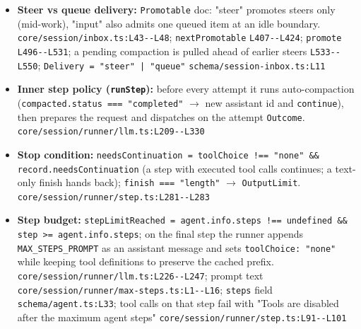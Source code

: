 \begin{itemize}
\item \textbf{Steer vs queue delivery:} \texttt{Promotable} doc: "steer" promotes steers only (mid-work), "input" also admits one queued item at an idle boundary. \texttt{core/\allowbreak{}session/\allowbreak{}inbox.\allowbreak{}ts:\allowbreak{}L43-\allowbreak{}-\allowbreak{}L48}; \texttt{nextPromotable} \texttt{L407-\allowbreak{}-\allowbreak{}L424}; \texttt{promote} \texttt{L496-\allowbreak{}-\allowbreak{}L531}; a pending compaction is pulled ahead of earlier steers \texttt{L533-\allowbreak{}-\allowbreak{}L550}; \texttt{Delivery = "steer" | "queue"} \texttt{schema/\allowbreak{}session-\allowbreak{}inbox.\allowbreak{}ts:\allowbreak{}L11}
\item \textbf{Inner step policy (\texttt{runStep}):} before every attempt it runs auto-compaction (\texttt{compacted.\allowbreak{}status === "completed"} $\rightarrow$ new assistant id and \texttt{continue}), then prepares the request and dispatches on the attempt \texttt{Outcome}. \texttt{core/\allowbreak{}session/\allowbreak{}runner/\allowbreak{}llm.\allowbreak{}ts:\allowbreak{}L209-\allowbreak{}-\allowbreak{}L330}
\item \textbf{Stop condition:} \texttt{needsContinuation = toolChoice !== "none" \&\& record.\allowbreak{}needsContinuation} (a step with executed tool calls continues; a text-only finish hands back); \texttt{finish === "length"} $\rightarrow$ \texttt{OutputLimit}. \texttt{core/\allowbreak{}session/\allowbreak{}runner/\allowbreak{}step.\allowbreak{}ts:\allowbreak{}L281-\allowbreak{}-\allowbreak{}L283}
\item \textbf{Step budget:} \texttt{stepLimitReached = agent.\allowbreak{}info.\allowbreak{}steps !== undefined \&\& step >= agent.\allowbreak{}info.\allowbreak{}steps}; on the final step the runner appends \texttt{MAX\_\allowbreak{}STEPS\_\allowbreak{}PROMPT} as an assistant message and sets \texttt{toolChoice:\allowbreak{} "none"} while keeping tool definitions to preserve the cached prefix. \texttt{core/\allowbreak{}session/\allowbreak{}runner/\allowbreak{}llm.\allowbreak{}ts:\allowbreak{}L226-\allowbreak{}-\allowbreak{}L247}; prompt text \texttt{core/\allowbreak{}session/\allowbreak{}runner/\allowbreak{}max-\allowbreak{}steps.\allowbreak{}ts:\allowbreak{}L1-\allowbreak{}-\allowbreak{}L16}; \texttt{steps} field \texttt{schema/\allowbreak{}agent.\allowbreak{}ts:\allowbreak{}L33}; tool calls on that step fail with "Tools are disabled after the maximum agent steps" \texttt{core/\allowbreak{}session/\allowbreak{}runner/\allowbreak{}step.\allowbreak{}ts:\allowbreak{}L91-\allowbreak{}-\allowbreak{}L101}

\end{itemize}
